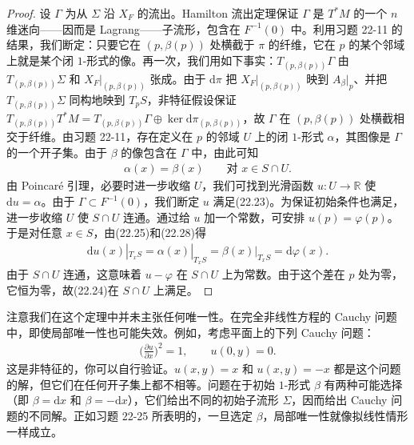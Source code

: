 \documentclass[../../main.tex]{subfiles}
\begin{document}
\begin{proof}
设 $\Gamma$ 为从 $\Sigma$ 沿 $X_F$ 的流出。Hamilton 流出定理保证 $\Gamma$ 是 $T^*M$ 的一个 $n$ 维迷向——因而是 Lagrang——子流形，包含在 $F^{-1}(0)$ 中。利用习题 22-11 的结果，我们断定：只要它在 $(p,\beta(p))$ 处横截于 $\pi$ 的纤维，它在 $p$ 的某个邻域上就是某个闭 $1$-形式的像。再一次，我们用如下事实：$T_{(p,\beta(p))}\Gamma$ 由 $T_{(p,\beta(p))}\Sigma$ 和 $X_F|_{(p,\beta(p))}$ 张成。由于 $\mathrm{d}\pi$ 把 $X_F|_{(p,\beta(p))}$ 映到 $A_\beta|_p$、并把 $T_{(p,\beta(p))}\Sigma$ 同构地映到 $T_pS$，非特征假设保证 $T_{(p,\beta(p))}T^*M=T_{(p,\beta(p))}\Gamma\oplus\ker\mathrm{d}\pi_{(p,\beta(p))}$，故 $\Gamma$ 在 $(p,\beta(p))$ 处横截相交于纤维。由习题 22-11，存在定义在 $p$ 的邻域 $U$ 上的闭 $1$-形式 $\alpha$，其图像是 $\Gamma$ 的一个开子集。由于 $\beta$ 的像包含在 $\Gamma$ 中，由此可知
\begin{align}
\alpha(x)=\beta(x)\qquad\text{对 }x\in S\cap U.
\end{align}
由 Poincar\'e 引理，必要时进一步收缩 $U$，我们可找到光滑函数 $u:U\to\mathbb R$ 使 $\mathrm{d}u=\alpha$。由于 $\Gamma\subset F^{-1}(0)$，我们断定 $u$ 满足(22.23)。为保证初始条件也满足，进一步收缩 $U$ 使 $S\cap U$ 连通。通过给 $u$ 加一个常数，可安排 $u(p)=\varphi(p)$。于是对任意 $x\in S$，由(22.25)和(22.28)得
\begin{align*}
\mathrm{d}u(x)|_{T_xS}=\alpha(x)|_{T_xS}=\beta(x)|_{T_xS}=\mathrm{d}\varphi(x).
\end{align*}
由于 $S\cap U$ 连通，这意味着 $u-\varphi$ 在 $S\cap U$ 上为常数。由于这个差在 $p$ 处为零，它恒为零，故(22.24)在 $S\cap U$ 上满足。
\end{proof}

注意我们在这个定理中并未主张任何唯一性。在完全非线性方程的 Cauchy 问题中，即使局部唯一性也可能失效。例如，考虑平面上的下列 Cauchy 问题：
\begin{align*}
\big(\tfrac{\partial u}{\partial x}\big)^2=1,\qquad u(0,y)=0.
\end{align*}
这是非特征的，你可以自行验证。$u(x,y)=x$ 和 $u(x,y)=-x$ 都是这个问题的解，但它们在任何开子集上都不相等。问题在于初始 $1$-形式 $\beta$ 有两种可能选择（即 $\beta=\mathrm{d}x$ 和 $\beta=-\mathrm{d}x$），它们给出不同的初始子流形 $\Sigma$，因而给出 Cauchy 问题的不同解。正如习题 22-25 所表明的，一旦选定 $\beta$，局部唯一性就像拟线性情形一样成立。
\end{document}
